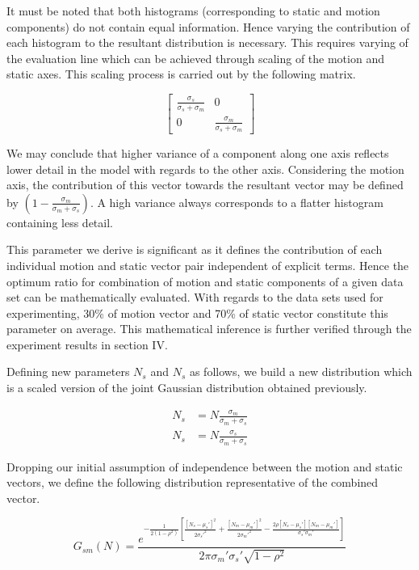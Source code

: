 It must be noted that both histograms (corresponding to static and motion components) do not contain equal information. Hence varying the contribution of each histogram to the resultant distribution is necessary. This requires varying of the evaluation line which can be achieved through scaling of the motion and static axes. This scaling process is carried out by the following matrix.


\[
\begin{bmatrix}
    \frac {\sigma_s}{\sigma_s + \sigma_m} & 0  \\
    0 & \frac {\sigma_m}{\sigma_s + \sigma_m}
\end{bmatrix}
\]

We may conclude that higher variance of a component along one axis reflects lower detail in the model with regards to the other axis. Considering the motion axis, the contribution of this vector towards the resultant vector may be defined by $(1-\frac{\sigma_m}{\sigma_m+\sigma_s})$. A high variance always corresponds to a flatter histogram containing less detail.

This parameter we derive is significant as it defines the contribution of each individual motion and static vector pair independent of explicit terms. Hence the optimum ratio for combination of motion and static components of a given data set can be mathematically evaluated. With regards to the data sets used for experimenting, 30\% of motion
vector and 70\% of static vector constitute this parameter on average. This mathematical inference is further verified through the experiment results in section IV.

Defining new parameters $N_s$ and $N_s$ as follows, we build a new distribution which is a scaled version of the joint Gaussian distribution obtained previously.

\begin{align*}
N_s &= N \frac{\sigma_m}{\sigma_m+\sigma_s}  \\
N_s &= N \frac{\sigma_s}{\sigma_m+\sigma_s}
\end{align*}

Dropping our initial assumption of independence between the motion and static vectors, we define the following distribution representative of the combined vector.

\begin{equation}
G_{sm}(N)= \frac{e^{-\frac{1}{2(1-\rho^2)}\left[\frac{[N_s-\mu_s']^2}{2\sigma_s'^2} + \frac{[N_m-\mu_m']^2}{2\sigma_m'^2} - \frac{2\rho[N_s-\mu_s'][N_m-\mu_m']}{\sigma_s' \sigma_m'}  \right]}}{2\pi\sigma_m'\sigma_s'\sqrt{1-\rho^2}}
\end{equation}

